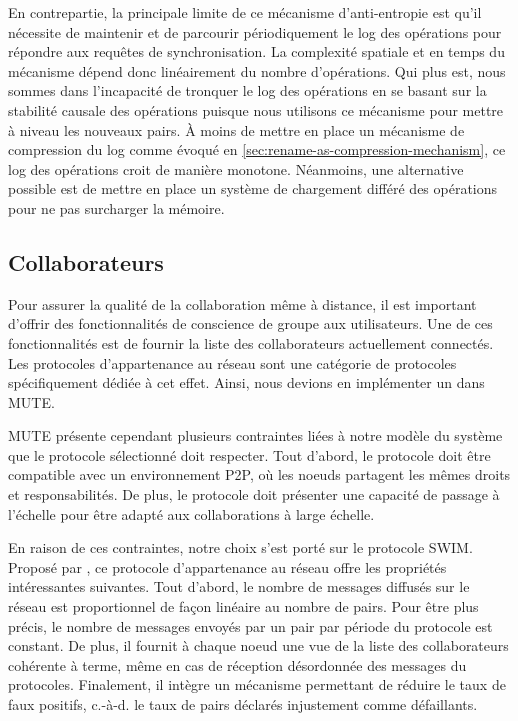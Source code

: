 \documentclass[12pt]{thesul}
\newcommand{\ie}{c.-à-d. }
\begin{document}
En contrepartie, la principale limite de ce mécanisme d'anti-entropie est qu'il nécessite de maintenir et de parcourir périodiquement le log des opérations pour répondre aux requêtes de synchronisation.
La complexité spatiale et en temps du mécanisme dépend donc linéairement du nombre d'opérations.
Qui plus est, nous sommes dans l'incapacité de tronquer le log des opérations en se basant sur la stabilité causale des opérations puisque nous utilisons ce mécanisme pour mettre à niveau les nouveaux pairs.
À moins de mettre en place un mécanisme de compression du log comme évoqué en \autoref{sec:rename-as-compression-mechanism}, ce log des opérations croit de manière monotone.
Néanmoins, une alternative possible est de mettre en place un système de chargement différé des opérations pour ne pas surcharger la mémoire.

\subsection{Collaborateurs}

Pour assurer la qualité de la collaboration même à distance, il est important d'offrir des fonctionnalités de conscience de groupe aux utilisateurs.
Une de ces fonctionnalités est de fournir la liste des collaborateurs actuellement connectés.
Les protocoles d'appartenance au réseau sont une catégorie de protocoles spécifiquement dédiée à cet effet.
Ainsi, nous devions en implémenter un dans MUTE.

MUTE présente cependant plusieurs contraintes liées à notre modèle du système que le protocole sélectionné doit respecter.
Tout d'abord, le protocole doit être compatible avec un environnement \ac{P2P}, où les noeuds partagent les mêmes droits et responsabilités.
De plus, le protocole doit présenter une capacité de passage à l'échelle pour être adapté aux collaborations à large échelle.

En raison de ces contraintes, notre choix s'est porté sur le protocole SWIM\cite{swim2002}.
Proposé par \citeauthor{swim2002}, ce protocole d'appartenance au réseau offre les propriétés intéressantes suivantes.
Tout d'abord, le nombre de messages diffusés sur le réseau est proportionnel de façon linéaire au nombre de pairs.
Pour être plus précis, le nombre de messages envoyés par un pair par période du protocole est constant.
De plus, il fournit à chaque noeud une vue de la liste des collaborateurs cohérente à terme, même en cas de réception désordonnée des messages du protocoles.
Finalement, il intègre un mécanisme permettant de réduire le taux de faux positifs, \ie le taux de pairs déclarés injustement comme défaillants.
\end{document}
